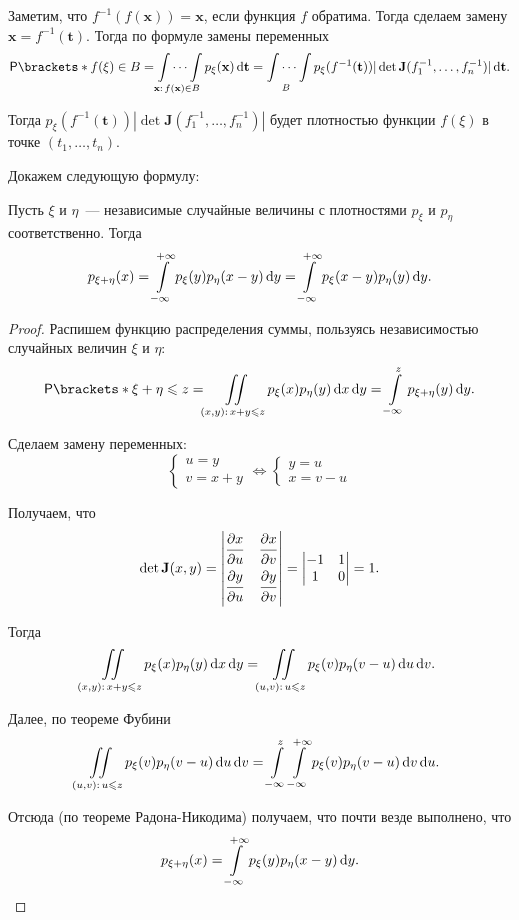Заметим, что \(f^{-1}(f(\mathbf{x})) = \mathbf{x}\), если функция \(f\) обратима. Тогда сделаем замену \(\mathbf{x} = f^{-1}(\mathbf{t})\). Тогда по формуле замены переменных
\[
\Pr{f(\xi) \in B} = \idotsint\limits_{\mathbf{x}:\,f(\mathbf{x}) \in B} p_{\xi}(\mathbf{x}) \diff\mathbf{t} = \idotsint\limits_{B} p_{\xi}(f^{-1}(\mathbf{t}))|\det \mathbf{J}(f^{-1}_1, \dots, f^{-1}_n)| \diff\mathbf{t}.
\]

Тогда \(p_{\xi}(f^{-1}(\mathbf{t}))|\det \mathbf{J}(f^{-1}_1, \dots, f^{-1}_n)|\) будет плотностью функции \(f(\xi)\) в точке \((t_1, \dots, t_n)\).

Докажем следующую формулу:
\begin{theorem}
	Пусть \(\xi\) и \(\eta\)~--- независимые случайные величины с плотностями \(p_{\xi}\) и \(p_{\eta}\) соответственно. Тогда
	\[
	p_{\xi + \eta}(x) = \int\limits_{-\infty}^{+\infty} p_{\xi}(y)p_{\eta}(x - y)\mathop{}\!\mathrm{d} y = \int\limits_{-\infty}^{+\infty} p_{\xi}(x - y)p_{\eta}(y)\mathop{}\!\mathrm{d} y.
	\]
\end{theorem}
\begin{proof}
	Распишем функцию распределения суммы, пользуясь независимостью случайных величин \(\xi\) и \(\eta\): 
	\[
	\Pr{\xi + \eta \leq z} = \iint\limits_{(x, y):\,x + y \leq z} p_{\xi}(x)p_{\eta}(y)\diff x \diff y = \int\limits_{-\infty}^{z} p_{\xi + \eta}(y)\diff y.
	\]
	
	Сделаем замену переменных:
	\[
	\begin{cases}
	u = y \\
	v = x + y
	\end{cases}
	\iff
	\begin{cases}
	y = u \\
	x = v - u
	\end{cases}
	\]
	
	Получаем, что 
	\[
	\det \mathbf{J}(x, y) = 
	\begin{vmatrix}
	\dfrac{\strut\partial x}{\strut\partial u} & \dfrac{\strut\partial x}{\strut\partial v} \\
	\dfrac{\strut\partial y}{\strut\partial u} & \dfrac{\strut\partial y}{\strut\partial v}
	\end{vmatrix} =
	\begin{vmatrix}
	-1 & 1 \\
	1 & 0
	\end{vmatrix}
	= 1.
	\]
	
	Тогда
	\[
	\iint\limits_{(x, y):\,x + y \leqslant z} p_{\xi}(x)p_{\eta}(y)\mathop{}\!\mathrm{d} x \mathop{}\!\mathrm{d} y = \iint\limits_{(u, v):\,u \leqslant z} p_{\xi}(v)p_{\eta}(v - u)\mathop{}\!\mathrm{d} u \mathop{}\!\mathrm{d} v.
	\]
	
	Далее, по теореме Фубини
	\[
	\iint\limits_{(u, v):\,u \leqslant z} p_{\xi}(v)p_{\eta}(v - u)\mathop{}\!\mathrm{d} u \mathop{}\!\mathrm{d} v = \int\limits_{-\infty}^{z}\int\limits_{-\infty}^{+\infty} p_{\xi}(v)p_{\eta}(v - u)\mathop{}\!\mathrm{d} v \mathop{}\!\mathrm{d} u.
	\]
	
	Отсюда (по теореме Радона-Никодима) получаем, что почти везде выполнено, что
	\[
	p_{\xi + \eta}(x) = \int\limits_{-\infty}^{+\infty} p_{\xi}(y)p_{\eta}(x - y)\mathop{}\!\mathrm{d} y.\qedhere
	\]
\end{proof}


